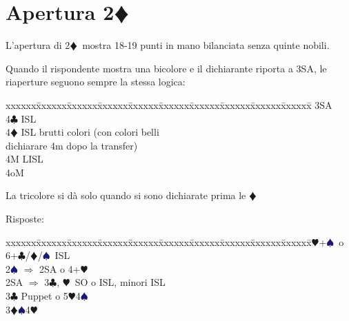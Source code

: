 \documentclass[a4paper,italian]{article}
\newcommand{\BC}{\textcolor{OliveGreen}{$\clubsuit$}}
\newcommand{\BD}{\textcolor{RedOrange}{$\vardiamondsuit$}}
\newcommand{\BH}{\textcolor{Red2}{$\varheartsuit${}}}
\newcommand{\BS}{\textcolor{MidnightBlue}{$\spadesuit${}}}
\newcommand{\pdfd}{\texorpdfstring{\BD{}}{D}}
\newenvironment{bidtable}
{\begin{tabbing}

    xxxxxx\=xxxxxx\=xxxxxx\=xxxxxx\=xxxxxx\=xxxxxx\=xxxxxx\=xxxxxx\=xxxxxx\=xxxxxx\=\kill}
{\end{tabbing} }%
\newenvironment{sviluppi}
{\begin{tcolorbox}[colframe=azzurro,title=Sviluppi particolari]}
    {
\end{tcolorbox} }%
\begin{document}
                                    \section{Apertura 2\pdfd}
                                    \begin{multicols}{2}
                                        L'apertura di 2\BD\ mostra 18-19 punti in mano bilanciata senza quinte nobili.

                                        \begin{sviluppi}
                                            Quando il rispondente mostra una bicolore e il dichiarante riporta a 3SA, le riaperture seguono sempre la stessa logica:

                                            \begin{bidtable}\label{Riapertura3SA}
                                                3SA\+\\
                                                4\BC {} ISL\\
                                                4\BD {} ISL brutti colori (con colori belli\+\\ dichiarare 4m dopo la transfer)\-\\
                                                4M  LISL\\
                                                4oM \\
                                            \end{bidtable}
                                            La tricolore si dà solo quando si sono dichiarate prima le \BD
                                        \end{sviluppi}
                                        Risposte:
                                        \bigbreak
                                        \begin{bidtable}
                                            2\BH {}+\BS\ o 6+\BC /\BD /\BS\ ISL\\
                                            2\BS \> $\Rightarrow$ 2SA o 4+\BH \\
                                            2SA \> $\Rightarrow$ 3\BC , \BH\ SO o ISL, minori ISL\\
                                            3\BC \> Puppet o 5\BH 4\BS \\
                                            3\BD {}\BS 4\BH \\

\end{bidtable}
\end{multicols}
\end{document}
